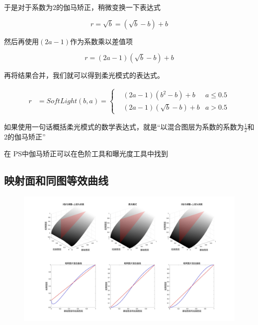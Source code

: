于是对于系数为$2$的伽马矫正，稍微变换一下表达式

\begin{equation}
	r =\sqrt{b}= (\sqrt{b}-b) +b
	\end{equation}

然后再使用$(2a-1)$作为系数乘以差值项

\begin{equation}
	r =(2a-1)(\sqrt{b}-b) +b
\end{equation}

再将结果合并，我们就可以得到柔光模式的表达式。

\begin{equation}
	\begin{aligned}r&= SoftLight(b,a)=\left\{\begin{aligned}&(2a-1)(b^2-b)+b&a\leq0.5\\&(2a-1)(\sqrt{b}-b)+b&a>0.5\end{aligned}\right.\end{aligned}
\end{equation}


\begin{notice}
	\item 如果使用一句话概括柔光模式的数学表达式，就是“以混合图层为系数的系数为$\frac{1}{2}$和$2$的伽马矫正”
	\item  在 PS中伽马矫正可以在色阶工具和曝光度工具中找到
\end{notice}
 \newpage
\subsection{ 映射面和同图等效曲线}
\begin{figure}[h!]
	\centering
	\includegraphics[width=\linewidth]{figure/柔光}
	\caption{}
	\label{fig:}
\end{figure}


